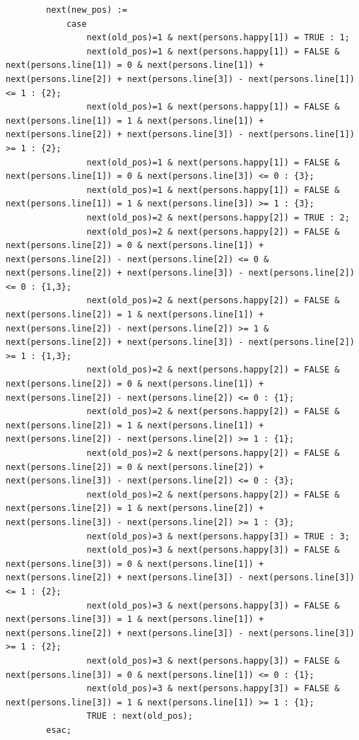 \documentclass[twoside,openright]{article}
\begin{document}
\begin{appendices}
\begin{lstlisting}
		next(new_pos) :=
			case
				next(old_pos)=1 & next(persons.happy[1]) = TRUE : 1;
				next(old_pos)=1 & next(persons.happy[1]) = FALSE & next(persons.line[1]) = 0 & next(persons.line[1]) + next(persons.line[2]) + next(persons.line[3]) - next(persons.line[1]) <= 1 : {2};
				next(old_pos)=1 & next(persons.happy[1]) = FALSE & next(persons.line[1]) = 1 & next(persons.line[1]) + next(persons.line[2]) + next(persons.line[3]) - next(persons.line[1]) >= 1 : {2};
				next(old_pos)=1 & next(persons.happy[1]) = FALSE & next(persons.line[1]) = 0 & next(persons.line[3]) <= 0 : {3};
				next(old_pos)=1 & next(persons.happy[1]) = FALSE & next(persons.line[1]) = 1 & next(persons.line[3]) >= 1 : {3};
				next(old_pos)=2 & next(persons.happy[2]) = TRUE : 2;
				next(old_pos)=2 & next(persons.happy[2]) = FALSE & next(persons.line[2]) = 0 & next(persons.line[1]) + next(persons.line[2]) - next(persons.line[2]) <= 0 & next(persons.line[2]) + next(persons.line[3]) - next(persons.line[2]) <= 0 : {1,3};
				next(old_pos)=2 & next(persons.happy[2]) = FALSE & next(persons.line[2]) = 1 & next(persons.line[1]) + next(persons.line[2]) - next(persons.line[2]) >= 1 & next(persons.line[2]) + next(persons.line[3]) - next(persons.line[2])  >= 1 : {1,3};
				next(old_pos)=2 & next(persons.happy[2]) = FALSE & next(persons.line[2]) = 0 & next(persons.line[1]) + next(persons.line[2]) - next(persons.line[2]) <= 0 : {1};
				next(old_pos)=2 & next(persons.happy[2]) = FALSE & next(persons.line[2]) = 1 & next(persons.line[1]) + next(persons.line[2]) - next(persons.line[2]) >= 1 : {1};
				next(old_pos)=2 & next(persons.happy[2]) = FALSE & next(persons.line[2]) = 0 & next(persons.line[2]) + next(persons.line[3]) - next(persons.line[2]) <= 0 : {3};
				next(old_pos)=2 & next(persons.happy[2]) = FALSE & next(persons.line[2]) = 1 & next(persons.line[2]) + next(persons.line[3]) - next(persons.line[2]) >= 1 : {3};
				next(old_pos)=3 & next(persons.happy[3]) = TRUE : 3;
				next(old_pos)=3 & next(persons.happy[3]) = FALSE & next(persons.line[3]) = 0 & next(persons.line[1]) + next(persons.line[2]) + next(persons.line[3]) - next(persons.line[3]) <= 1 : {2};
				next(old_pos)=3 & next(persons.happy[3]) = FALSE & next(persons.line[3]) = 1 & next(persons.line[1]) + next(persons.line[2]) + next(persons.line[3]) - next(persons.line[3]) >= 1 : {2};
				next(old_pos)=3 & next(persons.happy[3]) = FALSE & next(persons.line[3]) = 0 & next(persons.line[1]) <= 0 : {1};
				next(old_pos)=3 & next(persons.happy[3]) = FALSE & next(persons.line[3]) = 1 & next(persons.line[1]) >= 1 : {1};
				TRUE : next(old_pos);
		esac;


\end{lstlisting}
\end{appendices}
\end{document}
